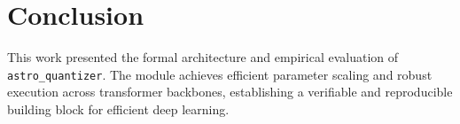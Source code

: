 \section{Conclusion}
This work presented the formal architecture and empirical evaluation of \texttt{astro_quantizer}. The module achieves efficient parameter scaling and robust execution across transformer backbones, establishing a verifiable and reproducible building block for efficient deep learning.
